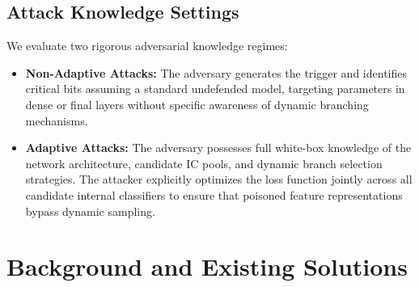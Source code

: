 \documentclass[conference,10pt]{IEEEtran}
\begin{document}
\subsection{Attack Knowledge Settings}
We evaluate two rigorous adversarial knowledge regimes:
\begin{itemize}
    \item \textbf{Non-Adaptive Attacks:} The adversary generates the trigger and identifies critical bits assuming a standard undefended model, targeting parameters in dense or final layers without specific awareness of dynamic branching mechanisms.
    \item \textbf{Adaptive Attacks:} The adversary possesses full white-box knowledge of the network architecture, candidate IC pools, and dynamic branch selection strategies. The attacker explicitly optimizes the loss function jointly across all candidate internal classifiers to ensure that poisoned feature representations bypass dynamic sampling.
\end{itemize}


\section{Background and Existing Solutions}
\end{document}

